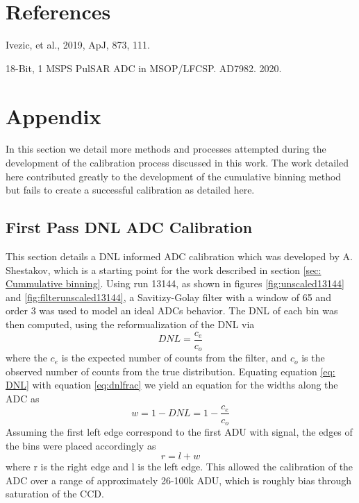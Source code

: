 \documentclass[11pt, letterpaper]{article}
\begin{document}
\section{References}
\label{sec:Ref}

Ivezic, et al., 2019, ApJ, 873, 111.

18-Bit, 1 MSPS PulSAR ADC in MSOP/LFCSP. AD7982. 2020. 

\section{Appendix}
\label{sec:appendix}
\indent

In this section we detail more methods and processes attempted during the development of the calibration process discussed in this work. 
The work detailed here contributed greatly to the development of the cumulative binning method but fails to create a successful calibration as detailed here.
\indent

\subsection{First Pass DNL ADC Calibration}
\label{sec:Adrianmethod}
\indent


This section details a DNL informed ADC calibration which was developed by A. Shestakov, which is a starting point for the work described in section \ref{sec: Cummulative binning}. 
Using run 13144, as shown in figures \ref{fig:unscaled13144} and \ref{fig:filterunscaled13144}, a Savitizy-Golay filter with a window of 65 and order 3 was used to model an ideal ADCs behavior. 
The DNL of each bin was then computed, using the reformualization of the DNL via 
 \begin{equation}
 DNL = \frac{c_e}{c_o}
 \label{eq:dnlfrac}
 \end{equation}
where the $c_{e}$ is the expected number of counts from the filter, and $c_{o}$ is the observed number of counts from the true distribution. 
Equating equation \ref{eq: DNL} with equation \ref{eq:dnlfrac} we yield an equation for the widths along the ADC as
 \begin{equation}
 w = 1-DNL = 1- \frac{c_e}{c_o}
 \end{equation}
Assuming the first left edge correspond to the first ADU with signal, the edges of the bins were placed accordingly as
 \begin{equation}
r = l + w 
\end{equation}
where r is the right edge and l is the left edge. 
This allowed the calibration of the ADC over a range of approximately 26-100k ADU, which is roughly bias through saturation of the CCD.  
\end{document}
